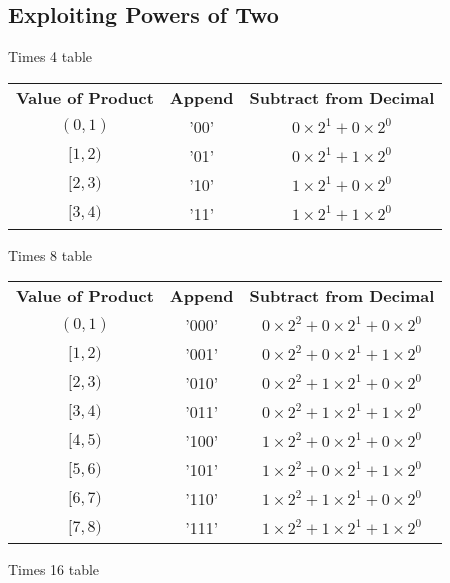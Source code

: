 \documentclass[12pt]{article}
\begin{document}
\subsection{Exploiting Powers of Two}
Times 4 table
\begin{center}
\begin{tabular}{c|c|c}
    \textbf{Value of Product} & \textbf{Append} & \textbf{Subtract from Decimal} \\
    $(0,1)$   & '00' & $0\times2^1 + 0\times2^0$ \\
    $[1,2)$   & '01' & $0\times2^1 + 1\times2^0$ \\
    $[2,3)$   & '10' & $1\times2^1 + 0\times2^0$ \\
    $[3,4)$   & '11' & $1\times2^1 + 1\times2^0$
\end{tabular}
\end{center}
Times 8 table
\begin{center}
\begin{tabular}{c|c|c}
    \textbf{Value of Product} & \textbf{Append} & \textbf{Subtract from Decimal} \\
    $(0,1)$   & '000' & $0\times2^2 + 0\times2^1 + 0\times2^0$ \\
    $[1,2)$   & '001' & $0\times2^2 + 0\times2^1 + 1\times2^0$ \\
    $[2,3)$   & '010' & $0\times2^2 + 1\times2^1 + 0\times2^0$ \\
    $[3,4)$   & '011' & $0\times2^2 + 1\times2^1 + 1\times2^0$ \\
    $[4,5)$   & '100' & $1\times2^2 + 0\times2^1 + 0\times2^0$ \\
    $[5,6)$   & '101' & $1\times2^2 + 0\times2^1 + 1\times2^0$ \\
    $[6,7)$   & '110' & $1\times2^2 + 1\times2^1 + 0\times2^0$ \\
    $[7,8)$   & '111' & $1\times2^2 + 1\times2^1 + 1\times2^0$
\end{tabular}
\end{center}
Times 16 table
\end{document}
